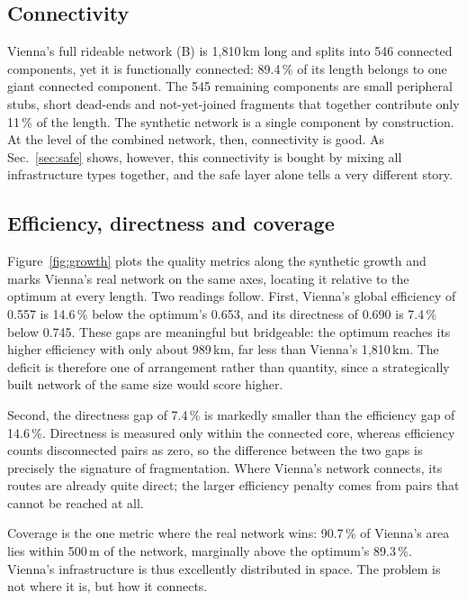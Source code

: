 \documentclass[11pt,a4paper]{article}
\begin{document}
\subsection{Connectivity}

Vienna's full rideable network (B) is 1{,}810\,km long and splits into 546 connected
components, yet it is functionally connected: 89.4\,\% of its length belongs to one giant
connected component. The 545 remaining components are small peripheral stubs, short
dead-ends and not-yet-joined fragments that together contribute only 11\,\% of the length.
The synthetic network is a single component by construction. At the level of the combined
network, then, connectivity is good. As Sec.~\ref{sec:safe} shows, however, this
connectivity is bought by mixing all infrastructure types together, and the safe layer
alone tells a very different story.

\subsection{Efficiency, directness and coverage}

Figure~\ref{fig:growth} plots the quality metrics along the synthetic growth and marks
Vienna's real network on the same axes, locating it relative to the optimum at every
length. Two readings follow. First, Vienna's global efficiency of 0.557 is 14.6\,\% below
the optimum's 0.653, and its directness of 0.690 is 7.4\,\% below 0.745. These gaps are
meaningful but bridgeable: the optimum reaches its higher efficiency with only about
989\,km, far less than Vienna's 1{,}810\,km. The deficit is therefore one of arrangement
rather than quantity, since a strategically built network of the same size would score
higher.

Second, the directness gap of 7.4\,\% is markedly smaller than the efficiency gap of
14.6\,\%. Directness is measured only within the connected core, whereas efficiency counts
disconnected pairs as zero, so the difference between the two gaps is precisely the
signature of fragmentation. Where Vienna's network connects, its routes are already quite
direct; the larger efficiency penalty comes from pairs that cannot be reached at all.

Coverage is the one metric where the real network wins: 90.7\,\% of Vienna's area lies
within 500\,m of the network, marginally above the optimum's 89.3\,\%. Vienna's
infrastructure is thus excellently distributed in space. The problem is not where it is,
but how it connects.
\end{document}
